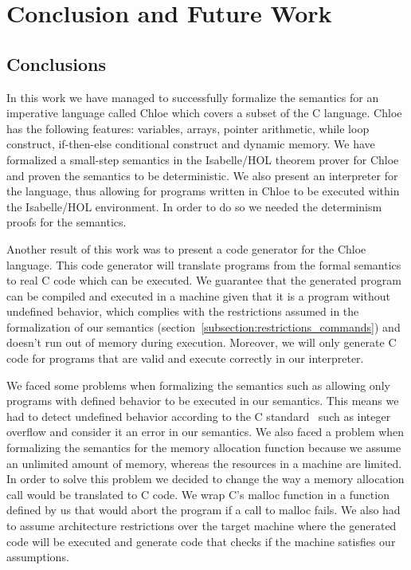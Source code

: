 \chapter{Conclusion and Future Work}\label{chapter:conclusion}

\section{Conclusions}

In this work we have managed to successfully formalize the semantics for an imperative language called Chloe which covers a subset of the C language.
Chloe has the following features: variables, arrays, pointer arithmetic, while loop construct, if-then-else conditional construct and dynamic memory.
We have formalized a small-step semantics in the Isabelle/HOL theorem prover for Chloe and proven the semantics to be deterministic.
We also present an interpreter for the language, thus allowing for programs written in Chloe to be executed within the Isabelle/HOL environment.
In order to do so we needed the determinism proofs for the semantics.

Another result of this work was to present a code generator for the Chloe language.
This code generator will translate programs from the formal semantics to real C code which can be executed.
We guarantee that the generated program can be compiled and executed in a machine given that it is a program without undefined behavior, which complies with the restrictions assumed in the formalization of our semantics (section~\ref{subsection:restrictions_commands}) and doesn't run out of memory during execution.
Moreover, we will only generate C code for programs that are valid and execute correctly in our interpreter.

We faced some problems when formalizing the semantics such as allowing only programs with defined behavior to be executed in our semantics.
This means we had to detect undefined behavior according to the C standard~\parencite{c99} such as integer overflow and consider it an error in our semantics.
We also faced a problem when formalizing the semantics for the memory allocation function because we assume an unlimited amount of memory, whereas the resources in a machine are limited.
In order to solve this problem we decided to change the way a memory allocation call would be translated to C code.
We wrap C's malloc function in a function defined by us that would abort the program if a call to malloc fails.
We also had to assume architecture restrictions over the target machine where the generated code will be executed and generate code that checks if the machine satisfies our assumptions.


